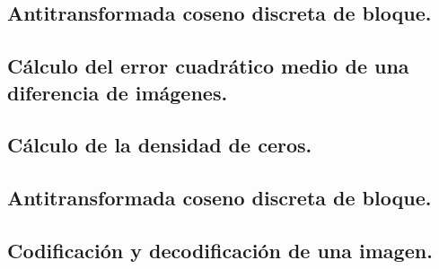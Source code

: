 \documentclass[%
	final,
	reprint,
	notitlepage,
	narroweqnarray,
	inline,
	twoside,
	invited
	]{ieee}
\begin{document}

\subsection{Antitransformada coseno discreta de bloque. }


\subsection{Cálculo del error cuadrático medio de una diferencia de imágenes. }


\subsection{Cálculo de la densidad de ceros. }


\subsection{Antitransformada coseno discreta de bloque. }


\subsection{Codificación y decodificación de una imagen.}

\end{document}
